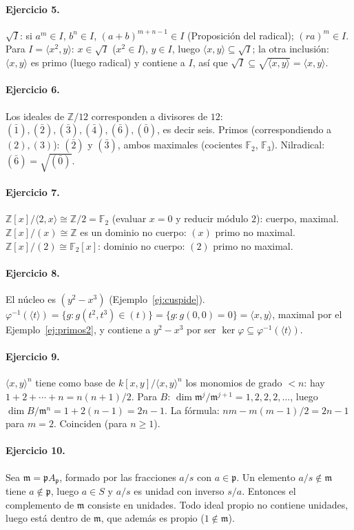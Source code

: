 \documentclass[11pt,a4paper]{article}
\newcommand{\ZZ}{\mathbb{Z}}
\newcommand{\FF}{\mathbb{F}}
\newcommand{\pp}{\mathfrak{p}}
\newcommand{\mm}{\mathfrak{m}}
\newcommand{\gen}[1]{\langle #1\rangle}
\theoremstyle{plain}
\theoremstyle{definition}
\theoremstyle{remark}
\newcounter{ej}
\begin{document}
\paragraph{Ejercicio 5.} $\sqrt I$: si $a^m\in I$, $b^n\in I$, $(a+b)^{m+n-1}\in I$ (Proposición del radical); $(ra)^m\in I$. Para $I=\gen{x^2,y}$: $x\in\sqrt I$ ($x^2\in I$), $y\in I$, luego $\gen{x,y}\subseteq\sqrt I$; la otra inclusión: $\gen{x,y}$ es primo (luego radical) y contiene a $I$, así que $\sqrt I\subseteq\sqrt{\gen{x,y}}=\gen{x,y}$.

\paragraph{Ejercicio 6.} Los ideales de $\ZZ/12$ corresponden a divisores de $12$: $(\bar1),(\bar2),(\bar3),(\bar4),(\bar6),(\bar0)$, es decir seis. Primos (correspondiendo a $(2),(3)$): $(\bar2)$ y $(\bar3)$, ambos maximales (cocientes $\FF_2$, $\FF_3$). Nilradical: $(\bar6)=\sqrt{(\bar0)}$.

\paragraph{Ejercicio 7.} $\ZZ[x]/\gen{2,x}\cong\ZZ/2=\FF_2$ (evaluar $x=0$ y reducir módulo $2$): cuerpo, maximal. $\ZZ[x]/(x)\cong\ZZ$ es un dominio no cuerpo: $(x)$ primo no maximal. $\ZZ[x]/(2)\cong\FF_2[x]$: dominio no cuerpo: $(2)$ primo no maximal.

\paragraph{Ejercicio 8.} El núcleo es $(y^2-x^3)$ (Ejemplo~\ref{ej:cuspide}). $\varphi^{-1}(\gen t)=\{g:g(t^2,t^3)\in(t)\}=\{g:g(0,0)=0\}=\gen{x,y}$, maximal por el Ejemplo~\ref{ej:primos2}, y contiene a $y^2-x^3$ por ser $\ker\varphi\subseteq\varphi^{-1}(\gen t)$.

\paragraph{Ejercicio 9.} $\gen{x,y}^n$ tiene como base de $k[x,y]/\gen{x,y}^n$ los monomios de grado $<n$: hay $1+2+\cdots+n=n(n+1)/2$. Para $B$: $\dim\mm^j/\mm^{j+1}=1,2,2,2,\dots$, luego $\dim B/\mm^n=1+2(n-1)=2n-1$. La fórmula: $nm-m(m-1)/2=2n-1$ para $m=2$. Coinciden (para $n\ge1$).

\paragraph{Ejercicio 10.} Sea $\mm=\pp A_\pp$, formado por las fracciones $a/s$ con $a\in\pp$. Un elemento $a/s\notin\mm$ tiene $a\notin\pp$, luego $a\in S$ y $a/s$ es unidad con inverso $s/a$. Entonces el complemento de $\mm$ consiste en unidades. Todo ideal propio no contiene unidades, luego está dentro de $\mm$, que además es propio ($1\notin\mm$).
\end{document}
